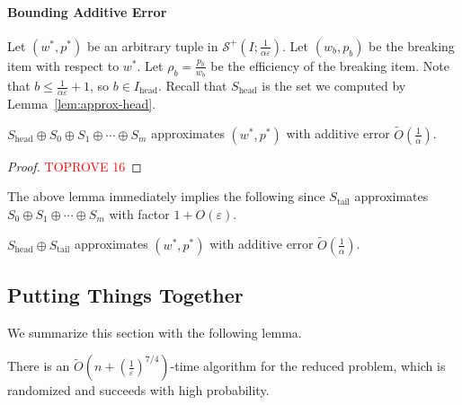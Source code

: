 \documentclass[a4paper,UKenglish,cleveref, autoref, thm-restate, pdfa]{lipics-v2021}
\newcommand{\eps}{\varepsilon}
\renewcommand{\leq}{\leqslant}
\begin{document}
\paragraph*{Bounding Additive Error}
Let $(w^*, p^*)$ be an arbitrary tuple in $\mathcal{S}^+(I; \frac{1}{\alpha\eps})$. Let $(w_b, p_b)$ be the breaking item with respect to $w^*$. Let $\rho_b = \frac{p_b}{w_b}$ be the efficiency of the breaking item. Note that $b \leq \frac{1}{\alpha\eps} + 1$, so $b \in I_{\mathrm{head}}$. Recall that $S_{\mathrm{head}}$ is the set we computed by Lemma~\ref{lem:approx-head}.

\begin{lemma}
    $S_{\mathrm{head}} \oplus S_0 \oplus S_1 \oplus \cdots \oplus S_m$ approximates $(w^*, p^*)$ with additive error $\tilde{O}(\frac{1}{\alpha})$.
\end{lemma}
\begin{proof}\textcolor{red}{TOPROVE 16}\end{proof}

The above lemma immediately implies the following since $S_{\mathrm{tail}}$ approximates $S_0 \oplus S_1 \oplus \cdots \oplus S_m$ with factor $1 + O(\eps)$.
\begin{corollary}
    $S_{\mathrm{head}} \oplus S_{\mathrm{tail}}$ approximates $(w^*, p^*)$ with additive error $\tilde{O}(\frac{1}{\alpha})$.
\end{corollary}

\subsection{Putting Things Together}
We summarize this section with the following lemma.
\begin{lemma}
   There is an $\tilde{O}({n+(\frac{1}{\eps})^{7/4}})$-time algorithm for the reduced problem, which is randomized and succeeds with high probability.
\end{lemma}
\end{document}
